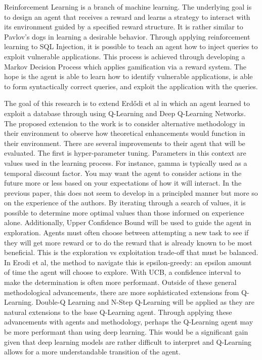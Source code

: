 \documentclass[conference]{IEEEtran}
\begin{document}
Reinforcement Learning is a branch of machine learning. The underlying goal is to design an agent that receives a reward and learns a strategy to interact with its environment guided by a specified reward structure. It is rather similar to Pavlov’s dogs in learning a desirable behavior. Through applying reinforcement learning to SQL Injection, it is possible to teach an agent how to inject queries to exploit vulnerable applications. This process is achieved through developing a Markov Decision Process which applies gamification via a reward system. The hope is the agent is able to learn how to identify vulnerable applications, is able to form syntactically correct queries, and exploit the application with the queries. 
\vspace{1mm} %

The goal of this research is to extend Erdődi et al in which an agent learned to exploit a database through using Q-Learning and Deep Q-Learning Networks. The proposed extension to the work is to consider alternative methodology in their environment to observe how theoretical enhancements would function in their environment. There are several improvements to their agent that will be evaluated. The first is hyper-parameter tuning. Parameters in this context are values used in the learning process. For instance, gamma is typically used as a temporal discount factor. You may want the agent to consider actions in the future more or less based on your expectations of how it will interact. In the previous paper, this does not seem to develop in a principled manner but more so on the experience of the authors. By iterating through a search of values, it is possible to determine more optimal values than those informed on experience alone. Additionally, Upper Confidence Bound will be used to guide the agent in exploration. Agents must often choose between attempting a new task to see if they will get more reward or to do the reward that is already known to be most beneficial. This is the exploration vs exploitation trade-off that must be balanced. In Erodi et al, the method to navigate this is epsilon-greedy: an epsilon amount of time the agent will choose to explore. With UCB, a confidence interval to make the determination is often more performant. Outside of these general methodological advancements, there are more sophisticated extensions from Q-Learning. Double-Q Learning and N-Step Q-Learning will be applied as they are natural extensions to the base Q-Learning agent. Through applying these advancements with agents and methodology, perhaps the Q-Learning agent may be more performant than using deep learning. This would be a significant gain given that deep learning models are rather difficult to interpret and Q-Learning allows for a more understandable transition of the agent. 
\end{document}
